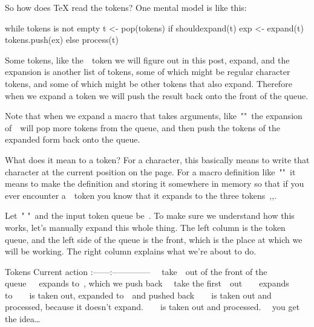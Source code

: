 So how does TeX read the tokens? One mental model is like this:

\starttyping
while tokens is not empty
    t <- pop(tokens)
    if shouldexpand(t)
        exp <- expand(t)
        tokens.push(ex)
    else
        process(t)
\stoptyping

Some tokens, like the~\type{\newif}~token we will figure out in this
post, expand, and the expansion is another list of tokens, some of which
might be regular character tokens, and some of which might be other
tokens that also expand. Therefore when we expand a token we will push
the result back onto the front of the queue.

Note that when we expand a macro that takes arguments,
like~\type"\def\paren#1{(#1)}"~the expansion of~\type{\paren}~will pop
more tokens from the queue, and then push the tokens of the expanded
form back onto the queue.

What does it mean to  a token? For a character, this
basically means to write that character at the current position on the
page.
For a macro definition like~\type"\def\bob{123}"~it means to make the
definition and storing it somewhere in memory so that if you ever
encounter a~\type{\bob}~token you know that it expands to the three
tokens~,,.

\startsectionlevel[title={A Short Example},reference={a-short-example}]

Let~\type"\def\A{a} \def\B{\A b} \def\C{\B\B}"~and the input token queue
be~\type{[\C]}. To make sure we understand how this works, let's
manually expand this whole thing. The left column is the token queue,
and the left side of the queue is the front, which is the place at which
we will be working. The right column explains what we're about to do.

Tokens  Current action
:------:--------------~\type{[\C]}~
take~\type{\C}~out of the front of the
queue~\type{[]}~~\type{\C}expands to~\type{\B\B}, which we
push back~\type{[\B \B]}~ take the
first~\type{\B}~out~\type{[\B]}~~\type{\B}~expands
to~\type{\A b``[\A b \B]}~~\type{\A}~is taken out, expanded
to~~and pushed back~\type{[ a b \B]}~~~is
taken out and processed, because it doesn't
expand.~\type{[ b \B]}~~~is taken out and
processed.~\type{[\B]}~ you get the
idea\ldots{}~\type{[\A b]}~~\type{[ a b]}~~\type{[ b]}~~\type{[]}~

